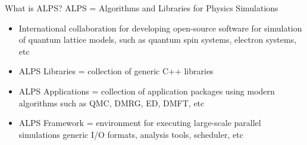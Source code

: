 
\begin{frame}[t,fragile]{What is ALPS?}
  ALPS = \alert{A}lgorithms and \alert{L}ibraries for \alert{P}hysics \alert{S}imulations
      \begin{itemize}
      \item International collaboration for developing open-source
        software for simulation of quantum lattice models, such as
        quantum spin systems, electron systems, etc
        \item ALPS Libraries = collection of generic C++ libraries
        \item ALPS Applications = collection of application packages
          using modern algorithms such as QMC, DMRG, ED, DMFT, etc
        \item ALPS Framework = environment for executing large-scale
          parallel simulations generic I/O formats, analysis tools,
          scheduler, etc
      \end{itemize}
\end{frame}

